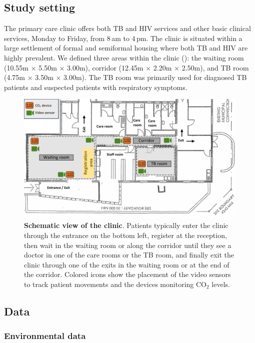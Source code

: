 \documentclass[fleqn,11pt]{wlscirep}
\begin{document}
\subsection{Study setting}

The primary care clinic offers both TB and HIV services and other basic clinical services, Monday to Friday, from 8\,am to 4\,pm. The clinic is situated within a large settlement of formal and semiformal housing where both TB and HIV are highly prevalent\cite{Wood2007AMJRCCD,Middelkoop2011JAIDS}. We defined three areas within the clinic (): the waiting room (10.55m $\times$ 5.50m $\times$ 3.00m), corridor (12.45m $\times$ 2.20m $\times$ 2.50m), and TB room (4.75m $\times$ 3.50m $\times$ 3.00m). The TB room was primarily used for diagnosed TB patients and suspected patients with respiratory symptoms.

\begin{figure}[!htpb]
    \centering
    \includegraphics{doc/clinic-schematic-annotated-view.pdf}
    \caption{\textbf{Schematic view of the clinic}. Patients typically enter the clinic through the entrance on the bottom left, register at the reception, then wait in the waiting room or along the corridor until they see a doctor in one of the care rooms or the TB room, and finally exit the clinic through one of the exits in the waiting room or at the end of the corridor. Colored icons show the placement of the video sensors to track patient movements and the devices monitoring CO$_2$ levels.}
    \label{fig:floor-plan}
\end{figure}


\subsection{Data}

\subsubsection{Environmental data}
\end{document}
